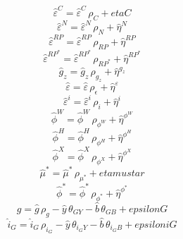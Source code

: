 \begin{dmath}
{\hat{\varepsilon}^C}={\hat{\varepsilon}^C}\, {\rho_{C}}+{etaC}
\end{dmath}
\begin{dmath}
{\hat{\varepsilon}^N}={\hat{\varepsilon}^N}\, {\rho_{N}}+{\hat{\eta}^{N}}
\end{dmath}
\begin{dmath}
{\hat{\varepsilon}^{RP}}={\hat{\varepsilon}^{RP}}\, {\rho_{RP}}+{\hat{\eta}^{RP}}
\end{dmath}
\begin{dmath}
{\hat{\varepsilon}^{RP^*}}={\hat{\varepsilon}^{RP^*}}\, {\rho_{RP^*}}+{\hat{\eta}^{RP^*}}
\end{dmath}
\begin{dmath}
{{\hat{g}_z}}={{\hat{g}_z}}\, {\rho_{g_z}}+{\hat{\eta}^{g_z}}
\end{dmath}
\begin{dmath}
{\hat{\varepsilon}}={\hat{\varepsilon}}\, {\rho_{\epsilon}}+{\hat{\eta}^{\varepsilon}}
\end{dmath}
\begin{dmath}
{\hat{\varepsilon}^i}={\hat{\varepsilon}^i}\, {\rho_{i}}+{\hat{\eta}^{i}}
\end{dmath}
\begin{dmath}
{\hat{\phi}^W}={\hat{\phi}^W}\, {\rho_{\phi^W}}+{\hat{\eta}^{\phi^W}}
\end{dmath}
\begin{dmath}
{\hat{\phi}^H}={\hat{\phi}^H}\, {\rho_{\phi^H}}+{\hat{\eta}^{\phi^H}}
\end{dmath}
\begin{dmath}
{\hat{\phi}^X}={\hat{\phi}^X}\, {\rho_{\phi^X}}+{\hat{\eta}^{\phi^X}}
\end{dmath}
\begin{dmath}
{\hat{\mu}^*}={\hat{\mu}^*}\, {\rho_{\mu^*}}+{etamustar}
\end{dmath}
\begin{dmath}
{\hat{\phi}^*}={\hat{\phi}^*}\, {\rho_{\phi^*}}+{\hat{\eta}^{\phi^*}}
\end{dmath}
\begin{dmath}
{\hat{g}}={\hat{g}}\, {\rho_{g}}-{\hat{y}}\, {\theta_{GY}}-{\hat{b}}\, {\theta_{GB}}+{epsilonG}
\end{dmath}
\begin{dmath}
{\hat{i}_G}={\hat{i}_G}\, {\rho_{i_G}}-{\hat{y}}\, {\theta_{i_GY}}-{\hat{b}}\, {\theta_{i_GB}}+{epsiloniG}
\end{dmath}
